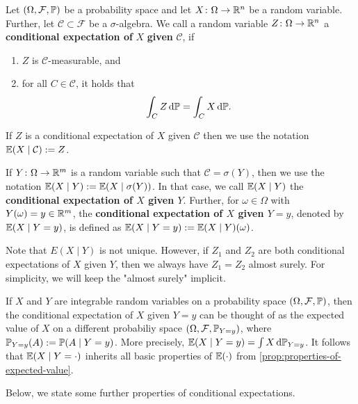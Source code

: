 \begin{definition}
    Let $(\Omega, \mathcal{F}, \mathbb{P})$ be a probability space and let $X\colon \Omega\to\mathbb{R}^n$ be a random variable.
    Further, let $\mathcal{C}\subset\mathcal{F}$ be a $\sigma$-algebra.
    We call a random variable $Z\colon \Omega\to\mathbb{R}^n$ a \textbf{conditional expectation of} $X$ \textbf{given} $\mathcal{C}$, if
    \begin{enumerate}
        \item $Z$ is $\mathcal{C}$-measurable, and
        \item for all $C\in \mathcal{C}$, it holds that
        \begin{equation*}
            \int_{C} Z \, \textnormal{d}\mathbb{P} = \int_{C} X \, \textnormal{d}\mathbb{P}.
        \end{equation*}
    \end{enumerate}
    If $Z$ is a conditional expectation of $X$ given $\mathcal{C}$ then we use the notation $\mathbb{E}(X \mid \mathcal{C}) := Z$.
    
    If $Y\colon\Omega\to \mathbb{R}^m$ is a random variable such that $\mathcal{C} = \sigma(Y)$, then
    we use the notation $\mathbb{E}(X \mid Y) := \mathbb{E}(X \mid \sigma(Y))$.
    In that case, we call $\mathbb{E}(X \mid Y)$ the \textbf{conditional expectation of $X$ given $Y$}.
    Further, for $\omega\in\Omega$ with $Y(\omega) = y\in\mathbb{R}^m$, the \textbf{conditional expectation of $X$ given $Y=y$}, denoted
    by $\mathbb{E}(X \mid Y = y)$, is defined as $\mathbb{E}(X \mid Y = y) := \mathbb{E}(X \mid Y)(\omega)$.
\end{definition}
Note that $E(X \mid Y)$ is not unique. However, if $Z_1$ and $Z_2$ are both conditional expectations
of $X$ given $Y$, then we always have $Z_1 = Z_2$ almost surely. For simplicity, we will keep the
"almost surely" implicit.
\begin{remark}
    \label{remark:conditional-expectation}
    If $X$ and $Y$ are integrable random variables on a probability space $(\Omega, \mathcal{F}, \mathbb{P})$, then
    the conditional expectation of $X$ given $Y=y$ can be thought of as the expected value of
    $X$ on a different probabiliy space $(\Omega, \mathcal{F}, \mathbb{P}_{Y=y})$, where
    $\mathbb{P}_{Y=y}(A) := \mathbb{P}(A \mid Y=y)$. More precisely,
    $\mathbb{E}(X \mid Y = y) = \int X \, \textnormal{d}\mathbb{P}_{Y=y}$. It follows that $\mathbb{E}(X \mid Y = \cdot)$
    inherits all basic properties of $\mathbb{E}(\cdot)$ from \cref{prop:properties-of-expected-value}.
\end{remark}
Below, we state some further properties of conditional expectations.

